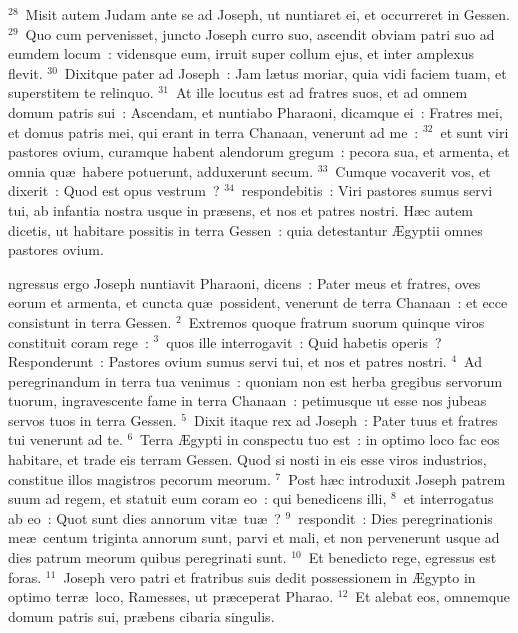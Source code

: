 ${}^{28}$~Misit autem Judam ante se ad Joseph, ut nuntiaret ei, et occurreret in Gessen.
${}^{29}$~Quo cum pervenisset, juncto Joseph curro suo, ascendit obviam patri suo ad eumdem locum~: vidensque eum, irruit super collum ejus, et inter amplexus flevit.
${}^{30}$~Dixitque pater ad Joseph~: Jam l\ae tus moriar, quia vidi faciem tuam, et superstitem te relinquo.
${}^{31}$~At ille locutus est ad fratres suos, et ad omnem domum patris sui~: Ascendam, et nuntiabo Pharaoni, dicamque ei~: Fratres mei, et domus patris mei, qui erant in terra Chanaan, venerunt ad me~:
${}^{32}$~et sunt viri pastores ovium, curamque habent alendorum gregum~: pecora sua, et armenta, et omnia qu\ae\ habere potuerunt, adduxerunt secum.
${}^{33}$~Cumque vocaverit vos, et dixerit~: Quod est opus vestrum~?
${}^{34}$~respondebitis~: Viri pastores sumus servi tui, ab infantia nostra usque in pr\ae sens, et nos et patres nostri. H\ae c autem dicetis, ut habitare possitis in terra Gessen~: quia detestantur \AE gyptii omnes pastores ovium.

\bchapter
{}ngressus ergo Joseph nuntiavit Pharaoni, dicens~: Pater meus et fratres, oves eorum et armenta, et cuncta qu\ae\ possident, venerunt de terra Chanaan~: et ecce consistunt in terra Gessen.
${}^{2}$~Extremos quoque fratrum suorum quinque viros constituit coram rege~:
${}^{3}$~quos ille interrogavit~: Quid habetis operis~? Responderunt~: Pastores ovium sumus servi tui, et nos et patres nostri.
${}^{4}$~Ad peregrinandum in terra tua venimus~: quoniam non est herba gregibus servorum tuorum, ingravescente fame in terra Chanaan~: petimusque ut esse nos jubeas servos tuos in terra Gessen.
${}^{5}$~Dixit itaque rex ad Joseph~: Pater tuus et fratres tui venerunt ad te.
${}^{6}$~Terra \AE gypti in conspectu tuo est~: in optimo loco fac eos habitare, et trade eis terram Gessen. Quod si nosti in eis esse viros industrios, constitue illos magistros pecorum meorum.
${}^{7}$~Post h\ae c introduxit Joseph patrem suum ad regem, et statuit eum coram eo~: qui benedicens illi,
${}^{8}$~et interrogatus ab eo~: Quot sunt dies annorum vit\ae\ tu\ae~?
${}^{9}$~respondit~: Dies peregrinationis me\ae\ centum triginta annorum sunt, parvi et mali, et non pervenerunt usque ad dies patrum meorum quibus peregrinati sunt.
${}^{10}$~Et benedicto rege, egressus est foras.
${}^{11}$~Joseph vero patri et fratribus suis dedit possessionem in \AE gypto in optimo terr\ae\ loco, Ramesses, ut pr\ae ceperat Pharao.
${}^{12}$~Et alebat eos, omnemque domum patris sui, pr\ae bens cibaria singulis.


